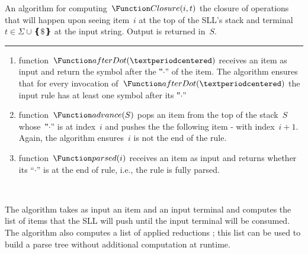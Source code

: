 \begin{algorithm}[p]
  \caption{\label{algorithm:sll-closure}
    An algorithm for computing~$\Function Closure(i,t)$ the closure
    of operations that will happen upon seeing item~$i$ at the top
    of the SLL's stack and terminal~$t∈Σ∪❴\$❵$ at the input string.
    Output is returned in~$S$.
  }
  \begin{algorithmic}
     
     
       
       
       
       
        \ENDWHILE
         
      \FI
       
    \ENDWHILE
     
  \end{algorithmic}
  \vspace{0.3ex}
  \hrule
  \vspace{0.3ex}
  \scriptsize
  \begin{enumerate}
    \item function~$\Function afterDot(·)$ receives an item as input
      and return the symbol after the ‟$·$” of the item.
      The algorithm ensures that for every invocation of~$\Function afterDot(·)$
      the input rule has at least one symbol after its ‟$·$”
    \item function~$\Function advance(S)$ pops an item from the top of
      the stack~$S$ whose~‟$·$” is at index~$i$ and pushes the
      the following item - with index~$i+1$.
      Again, the algorithm ensures~$i$ is not the end of the rule.
    \item function~$\Function parsed(i)$ receives an item as input
      and returns whether its ``$\cdot$'' is at the end of rule,
      i.e., the rule is fully parsed.
  \end{enumerate}
\
\end{algorithm}

The algorithm takes as input an item and an input terminal
  and computes the list of items that the SLL will push until
  the input terminal will be consumed.
The algorithm also computes a list of applied reductions ;
  this list can be used to build a parse tree without additional
  computation at runtime.

